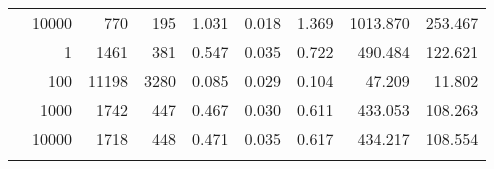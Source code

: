 \begin{table}
\begin{tabular}{rrrrrrrrr}
	            
					 &  
					 
					\multirow{ 1 }{*}{ 10000 } &
					
						
							    
							     770  & 195  
	                           & 1.031 & 0.018 & 1.369
	                           & 1013.870 & 253.467  \\
	                
	            
	        
				\noalign{\smallskip}\hline
				\multirow{ 4 }{*}{ 500000 } &
				
					
					 
					\multirow{ 1 }{*}{ 1 } &
					
						
							    
							     1461  & 381  
	                           & 0.547 & 0.035 & 0.722
	                           & 490.484 & 122.621  \\
	                
	            
					 &  
					 
					\multirow{ 1 }{*}{ 100 } &
					
						
							    
							     11198  & 3280  
	                           & 0.085 & 0.029 & 0.104
	                           & 47.209 & 11.802  \\
	                
	            
					 &  
					 
					\multirow{ 1 }{*}{ 1000 } &
					
						
							    
							     1742  & 447  
	                           & 0.467 & 0.030 & 0.611
	                           & 433.053 & 108.263  \\
	                
	            
					 &  
					 
					\multirow{ 1 }{*}{ 10000 } &
					
						
							    
							     1718  & 448  
	                           & 0.471 & 0.035 & 0.617
	                           & 434.217 & 108.554  \\
	                
	            
	        
				\noalign{\smallskip}\hline
				\multirow{ 4 }{*}{ 1000000 } &
				

\end{tabular}
\end{table}
